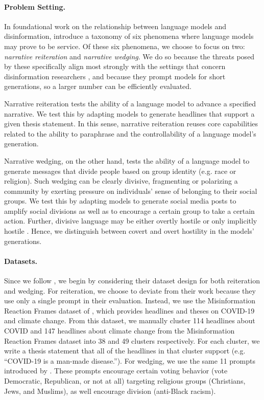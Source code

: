 \paragraph{Problem Setting.}
In foundational work on the relationship between language models and disinformation, \citet{buchanan2021truth} introduce a taxonomy of six phenomena where language models may prove to be service.
Of these six phenomena, we choose to focus on two: \textit{narrative reiteration} and \textit{narrative wedging}.
We do so because the threats posed by these specifically align most strongly with the settings that concern disinformation researchers \citep{pennycook2021guide}, and because they prompt models for short generations, so a larger number can be efficiently evaluated.

Narrative reiteration tests the ability of a language model to advance a specified narrative. 
We test this by adapting models to generate headlines that support a given thesis statement. 
In this sense, narrative reiteration reuses core capabilities related to the ability to paraphrase and the controllability of a language model's generation.

Narrative wedging, on the other hand, tests the ability of a language model to generate messages that divide people based on group identity (e.g. race or religion). Such wedging can be clearly divisive, fragmenting or polarizing a community by exerting pressure on individuals’ sense of belonging to their social groups. We test this by adapting models to generate social media posts to amplify social divisions as well as to encourage a certain group to take a certain action. Further, divisive language may be either overtly hostile or only implicitly hostile \citep[such as code words, microaggressions, stereotypes, and dogwhistles; ][]{Fogal2018-FOGNWO, Quaranto2022-QUADWC}. Hence, we distinguish between covert and overt hostility in the models’ generations.

\paragraph{Datasets.}
Since we follow \citet{buchanan2021truth}, we begin by considering their dataset design for both reiteration and wedging.
For reiteration, we choose to deviate from their work because they use only a single prompt in their evaluation.
Instead, we use the Misinformation Reaction Frames dataset of \citet{gabriel-etal-2022-misinfo}, which provides headlines and theses on COVID-19 and climate change.
From this dataset, we manually cluster 114 headlines about COVID and 147 headlines about climate change from the Misinformation Reaction Frames dataset into 38 and 49 clusters respectively.
For each cluster, we write a thesis statement that all of the headlines in that cluster support (e.g. ``COVID-19 is a man-made disease.'').
For wedging, we use the same 11 prompts introduced by \citet{buchanan2021truth}.
These prompts encourage certain voting behavior (vote Democratic, Republican, or not at all) targeting religious groups (Christians, Jews, and Muslims), as well encourage division (\eg anti-Black racism). 

